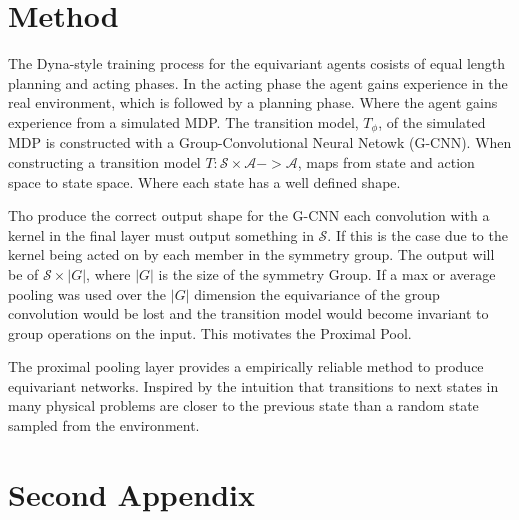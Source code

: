 \documentclass[mlabstract]{jmlr}
\begin{document}
\section{Method}
The Dyna-style training process for the equivariant agents cosists of equal length planning and acting phases. In the acting phase the agent gains experience in the real environment, which is followed by a planning phase. Where the agent gains experience from a simulated MDP. The transition model, $T_\phi$, of the simulated MDP is constructed with a Group-Convolutional Neural Netowk (G-CNN). When constructing a transition model $T: \mathcal{S} \times \mathcal{A} -> \mathcal{A}$, maps from state and action space to state space. Where each state has a well defined shape.

Tho produce the correct output shape for the G-CNN each convolution with a kernel in the final layer must output something in $\mathcal{S}$. If this is the case due to the kernel being acted on by each member in the symmetry group. The output will be of $\mathcal{S} \times |G|$, where $|G|$ is the size of the symmetry Group. If a max or average pooling was used over the $|G|$ dimension the equivariance of the group convolution would be lost and the transition model would become invariant to group operations on the input. This motivates the Proximal Pool. 

The proximal pooling layer provides a empirically reliable method to produce equivariant networks. Inspired by the intuition that transitions to next states in many physical problems are closer to the previous state than a random state sampled from the environment.


\label{sec:intro}




\appendix


\section{Second Appendix}\label{apd:second}
\end{document}
